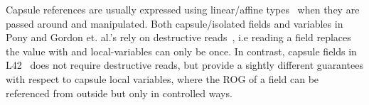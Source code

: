 Capsule references are usually expressed using linear/affine types~\cite{boyland2001alias} when they are passed around and manipulated. Both capsule/isolated fields and variables in Pony and Gordon et. al.'s rely on destructive reads~\cite{GordonEtAl12,clebsch2015deny}, i.e reading a field replaces the value with \Q@null@ and local-variables can only be once. In contrast, capsule fields in L42~\cite{ServettoEtAl13a,ServettoZucca15} does not require destructive reads, but provide a sightly different guarantees with respect to capsule local variables, where the ROG of a \Q@capsule@ field can be referenced from outside but only in controlled ways.



